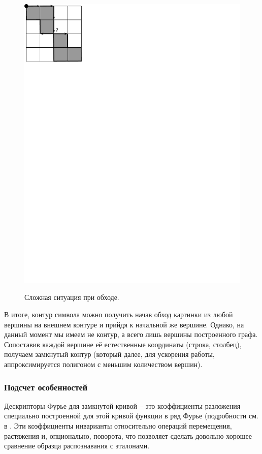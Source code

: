 \begin{figure}[H]
\centering
{\includegraphics[scale=0.9, trim = 0mm 215mm 155mm 0mm, clip]{imgs/where}}
\label{where}
\caption{Сложная ситуация при обходе.}
\end{figure}
В итоге, контур символа можно получить начав обход картинки из любой вершины на внешнем контуре 
и прийдя к начальной же вершине. Однако, на данный момент мы имеем не контур, а всего лишь вершины построенного графа.
Сопоставив каждой вершине её естественные координаты (строка, столбец), получаем замкнутый контур (который далее,
для ускорения работы, аппроксимируется полигоном с меньшим количеством вершин).

\subsubsection*{Подсчет особенностей}
\par Дескрипторы Фурье для замкнутой кривой -- это коэффициенты разложения 
специально построенной для этой кривой функции в ряд Фурье (подробности см. в \cite{zahn}. Эти коэффициенты инварианты относительно 
операций перемещения, растяжения и, опционально, поворота, что позволяет сделать довольно хорошее сравнение образца
распознавания с эталонами.

